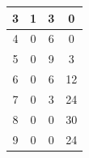 \documentclass[12pt]{article}
\newenvironment{sol}[1][Solution]{\begin{trivlist}\item[\hskip\labelsep {\bfseries #1:}]}{\end{trivlist}}
\begin{document}
\begin{enumerate}
\begin{sol}
\begin{center}
\begin{tabular}{|c|c|c|c|}
                 \hline
                                3&1 & 3&  0\\ 
                 \hline
                                 4& 0& 6&  0\\ 
                 \hline
                                5& 0& 9&  3\\ 
                 \hline
                                 6 &0 & 6& 12 \\ 
                 \hline
                                  7& 0& 3&  24\\ 
                 \hline
                                  8& 0& 0& 30 \\ 
                 \hline
                                  9& 0& 0& 24 \\ 
                 \hline
            \end{tabular}
        \end{center}
    \end{sol}




\end{enumerate}
\end{document}
